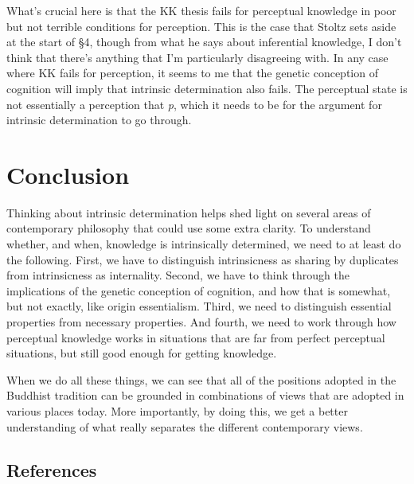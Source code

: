 \documentclass[
  11pt,
  letterpaper,
  DIV=11,
  numbers=noendperiod,
  twoside]{scrartcl}
\begin{document}
What's crucial here is that the KK thesis fails for perceptual knowledge
in poor but not terrible conditions for perception. This is the case
that Stoltz sets aside at the start of §4, though from what he says
about inferential knowledge, I don't think that there's anything that
I'm particularly disagreeing with. In any case where KK fails for
perception, it seems to me that the genetic conception of cognition will
imply that intrinsic determination also fails. The perceptual state is
not essentially a perception that \emph{p}, which it needs to be for the
argument for intrinsic determination to go through.

\section{Conclusion}\label{conclusion}

Thinking about intrinsic determination helps shed light on several areas
of contemporary philosophy that could use some extra clarity. To
understand whether, and when, knowledge is intrinsically determined, we
need to at least do the following. First, we have to distinguish
intrinsicness as sharing by duplicates from intrinsicness as
internality. Second, we have to think through the implications of the
genetic conception of cognition, and how that is somewhat, but not
exactly, like origin essentialism. Third, we need to distinguish
essential properties from necessary properties. And fourth, we need to
work through how perceptual knowledge works in situations that are far
from perfect perceptual situations, but still good enough for getting
knowledge.

When we do all these things, we can see that all of the positions
adopted in the Buddhist tradition can be grounded in combinations of
views that are adopted in various places today. More importantly, by
doing this, we get a better understanding of what really separates the
different contemporary views.

\subsection*{References}\label{references}
\end{document}
